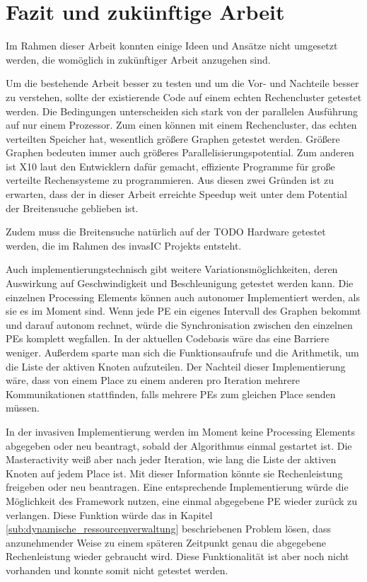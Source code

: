 \chapter{Fazit und zukünftige Arbeit} %
\label{cha:fazit_und_zuk_nftige_arbeit}

Im Rahmen dieser Arbeit konnten einige Ideen und Ansätze nicht umgesetzt werden, die womöglich in zukünftiger Arbeit anzugehen sind.

Um die bestehende Arbeit besser zu testen und um die Vor- und Nachteile besser zu verstehen, sollte der existierende Code auf einem echten Rechencluster getestet werden. Die Bedingungen unterscheiden sich stark von der parallelen Ausführung auf nur einem Prozessor. Zum einen können mit einem Rechencluster, das echten verteilten Speicher hat, wesentlich größere Graphen getestet werden. Größere Graphen bedeuten immer auch größeres Parallelisierungspotential. Zum anderen ist X10 laut den Entwicklern dafür gemacht, effiziente Programme für große verteilte Rechensysteme zu programmieren. Aus diesen zwei Gründen ist zu erwarten, dass der in dieser Arbeit erreichte Speedup weit unter dem Potential der Breitensuche geblieben ist. 

Zudem muss die Breitensuche natürlich auf der TODO Hardware getestet werden, die im Rahmen des invasIC Projekts entsteht.

Auch implementierungstechnisch gibt weitere Variationsmöglichkeiten, deren Auswirkung auf Geschwindigkeit und Beschleunigung getestet werden kann. Die einzelnen Processing Elements können auch autonomer Implementiert werden, als sie es im Moment sind. Wenn jede PE ein eigenes Intervall des Graphen bekommt und darauf autonom rechnet, würde die Synchronisation zwischen den einzelnen PEs komplett wegfallen. In der aktuellen Codebasis wäre das eine Barriere weniger. Außerdem sparte man sich die Funktionsaufrufe und die Arithmetik, um die Liste der aktiven Knoten aufzuteilen. Der Nachteil dieser Implementierung wäre, dass von einem Place zu einem anderen pro Iteration mehrere Kommunikationen stattfinden, falls mehrere PEs zum gleichen Place senden müssen. 

In der invasiven Implementierung werden im Moment keine Processing Elements abgegeben oder neu beantragt, sobald der Algorithmus einmal gestartet ist. Die Masteractivity weiß aber nach jeder Iteration, wie lang die Liste der aktiven Knoten auf jedem Place ist. Mit dieser Information könnte sie Rechenleistung freigeben oder neu beantragen. Eine entsprechende Implementierung würde die Möglichkeit des Framework nutzen, eine einmal abgegebene PE wieder zurück zu verlangen. Diese Funktion würde das in Kapitel \ref{sub:dynamische_ressourcenverwaltung} beschriebenen Problem lösen, dass anzunehmender Weise zu einem späteren Zeitpunkt genau die abgegebene Rechenleistung wieder gebraucht wird. Diese Funktionalität ist aber noch nicht vorhanden und konnte somit nicht getestet werden. 

